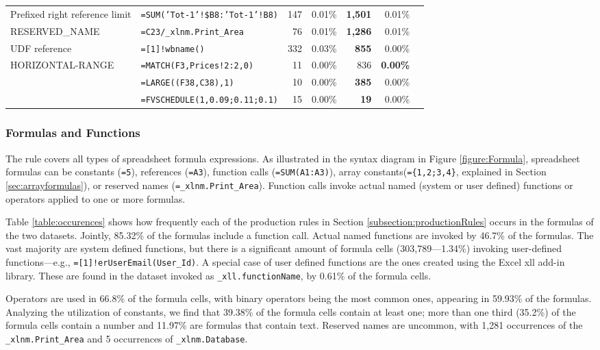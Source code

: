 \documentclass[conference]{IEEEtran}
\begin{document}
\begin{table}
\begin{tabular}{llrrrrr}
			Prefixed right reference limit & \texttt{=SUM('Tot-1'!\$B8:'Tot-1'!B8)}  & 147 & 0.01\% & \textbf{1,501} & 0.01\%\\
			RESERVED_NAME & \texttt{=C23/_xlnm.Print_Area}  & 76 & 0.01\% &\textbf{1,286} & 0.01\%\\
			UDF reference & \texttt{=[1]!wbname()}  & 332 & 0.03\% & \textbf{855} & 0.00\%\\
			HORIZONTAL-RANGE & \texttt{=MATCH(F3,Prices!2:2,0)}  & 11 & 0.00\% & 836 & \textbf{0.00\%}\\
			\synt{Union} & \texttt{=LARGE((F38,C38),1)}  & 10 & 0.00\% & \textbf{385} & 0.00\%\\
			\synt{ConstantArray} & \texttt{=FVSCHEDULE(1,{0.09;0.11;0.1})}  & 15 & 0.00\% & \textbf{19} & 0.00\%\\
			\hline
	\end{tabular}
\end{table}

\subsubsection{Formulas and Functions}

The  rule covers all types of spreadsheet formula expressions. As illustrated in the syntax diagram in Figure \ref{figure:Formula}, spreadsheet formulas can be constants (\texttt{=5}), references (\texttt{=A3}), function calls (\texttt{=SUM(A1:A3)}), array constants(\texttt{=\{1,2;3,4\}}, explained in Section \ref{sec:arrayformulas}), or reserved names (\texttt{=_xlnm.Print_Area}). Function calls invoke actual named (system or user defined) functions or operators applied to one or more formulas.

Table \ref{table:occurences} shows how frequently each of the production rules in Section \ref{subsection:productionRules} occurs in the formulas of the two datasets. Jointly, 85.32\% of the formulas include a function call. Actual named functions are invoked by 46.7\% of the formulas. The vast majority are system defined functions, but there is a significant amount of formula cells (303,789---1.34\%) invoking user-defined functions---e.g., \texttt{=[1]!erUserEmail(User_Id)}. A special case of user defined functions are the ones created using the Excel xll add-in library. These are found in the dataset invoked as \texttt{_xll.functionName}, by 0.61\% of the formula cells.

Operators are used in 66.8\% of the formula cells, with binary operators being the most common ones, appearing in 59.93\% of the formulas. Analyzing the utilization of constants, we find that 39.38\% of the formula cells contain at least one; more than one third (35.2\%) of the formula cells contain a number and 11.97\% are formulas that contain text. Reserved names are uncommon, with 1,281 occurrences of the \texttt{_xlnm.Print_Area} and 5 occurrences of \texttt{_xlnm.Database}.
\end{document}
